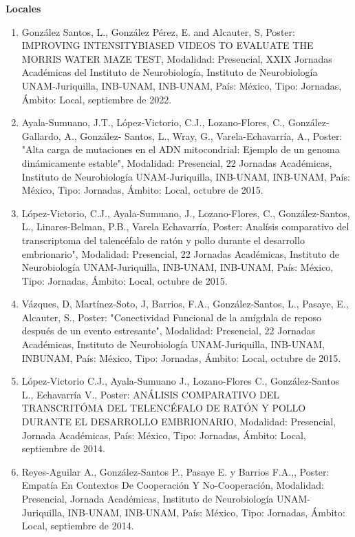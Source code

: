 \textbf{Locales}

\begin{enumerate}

\item  González Santos, L., González Pérez, E. and Alcauter, S, Poster: IMPROVING INTENSITYBIASED VIDEOS TO EVALUATE THE 
MORRIS 
WATER MAZE TEST, Modalidad: Presencial, XXIX Jornadas Académicas del Instituto de Neurobiología, Instituto de Neurobiología 
UNAM-Juriquilla, INB-UNAM, INB-UNAM, País: México, Tipo: Jornadas, Ámbito: Local, septiembre de 2022.

\item  Ayala-Sumuano, J.T., López-Victorio, C.J., Lozano-Flores, C., González-Gallardo, A., González-
Santos, L., Wray, G., Varela-Echavarría, A., Poster: "Alta carga de mutaciones en el ADN mitocondrial: Ejemplo de un genoma 
dinámicamente estable", Modalidad: Presencial, 22 Jornadas Académicas, Instituto de Neurobiología UNAM-Juriquilla, INB-UNAM, 
INB-UNAM, País: México, Tipo: Jornadas, Ámbito: Local, octubre de 2015.

\item  López-Victorio, C.J., Ayala-Sumuano, J., Lozano-Flores, C., González-Santos, L., Linares-Belman, P.B., Varela 
Echavarría, 
Poster: Analísis comparativo del transcriptoma del talencéfalo de ratón y pollo durante el desarrollo embrionario", 
Modalidad: Presencial, 22 Jornadas Académicas, Instituto de Neurobiología UNAM-Juriquilla, INB-UNAM, INB-UNAM, País: México, 
Tipo: Jornadas, Ámbito: Local, octubre de 2015.

\item  Vázques, D, Martínez-Soto, J, Barrios, F.A., González-Santos, L., Pasaye, E., Alcauter, S., Poster: "Conectividad 
Funcional de la amígdala de reposo después de un evento estresante", Modalidad: Presencial, 22 Jornadas Académicas, Instituto 
de Neurobiología UNAM-Juriquilla, INB-UNAM, INBUNAM, País: México, Tipo: Jornadas, Ámbito: Local, octubre de 2015.

\item  López-Victorio C.J., Ayala-Sumuano J., Lozano-Flores C., González-Santos L., Echavarría V., Poster: ANÁLISIS 
COMPARATIVO 
DEL TRANSCRITÓMA DEL TELENCÉFALO DE RATÓN Y POLLO DURANTE EL DESARROLLO EMBRIONARIO, Modalidad: Presencial, Jornada 
Académicas, País: México, Tipo: Jornadas, Ámbito: Local, septiembre de 2014.

\item  Reyes-Aguilar A., González-Santos P., Pasaye E. y Barrios F.A.,, Poster: Empatía En Contextos De Cooperación Y 
No-Cooperación, Modalidad: Presencial, Jornada Académicas, Instituto de Neurobiología UNAM-Juriquilla, INB-UNAM, INB-UNAM, 
País: México, Tipo: Jornadas, Ámbito: Local, septiembre de 2014.


\end{enumerate}

